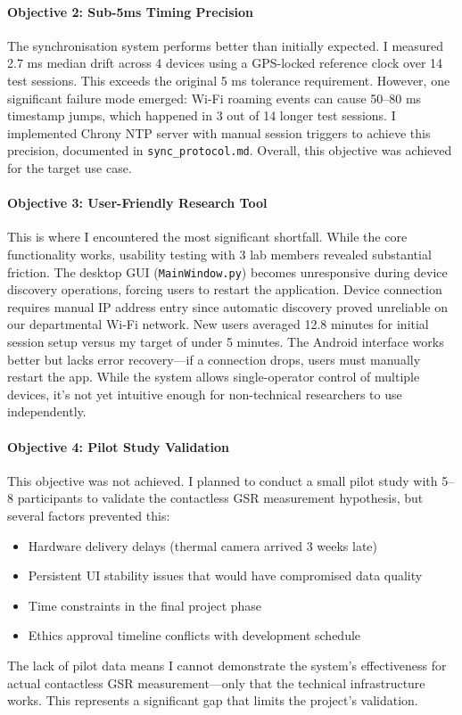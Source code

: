 \paragraph{\textbf{Objective 2: Sub-5ms Timing Precision}} The synchronisation system performs better than initially expected. I measured 2.7 ms median drift across 4 devices using a GPS-locked reference clock over 14 test sessions. This exceeds the original \textpm{}5 ms tolerance requirement. However, one significant failure mode emerged: Wi-Fi roaming events can cause 50--80 ms timestamp jumps, which happened in 3 out of 14 longer test sessions. I implemented Chrony NTP server with manual session triggers to achieve this precision, documented in \texttt{sync\_protocol.md}. Overall, this objective was achieved for the target use case.

\paragraph{\textbf{Objective 3: User-Friendly Research Tool}} This is where I encountered the most significant shortfall. While the core functionality works, usability testing with 3 lab members revealed substantial friction. The desktop GUI (\texttt{MainWindow.py}) becomes unresponsive during device discovery operations, forcing users to restart the application. Device connection requires manual IP address entry since automatic discovery proved unreliable on our departmental Wi-Fi network. New users averaged 12.8 minutes for initial session setup versus my target of under 5 minutes. The Android interface works better but lacks error recovery---if a connection drops, users must manually restart the app. While the system allows single-operator control of multiple devices, it's not yet intuitive enough for non-technical researchers to use independently.

\paragraph{\textbf{Objective 4: Pilot Study Validation}} This objective was not achieved. I planned to conduct a small pilot study with 5--8 participants to validate the contactless GSR measurement hypothesis, but several factors prevented this:
\begin{itemize}
  \item Hardware delivery delays (thermal camera arrived 3 weeks late)
  \item Persistent UI stability issues that would have compromised data quality
  \item Time constraints in the final project phase
  \item Ethics approval timeline conflicts with development schedule
\end{itemize}
The lack of pilot data means I cannot demonstrate the system's effectiveness for actual contactless GSR measurement---only that the technical infrastructure works. This represents a significant gap that limits the project's validation.

